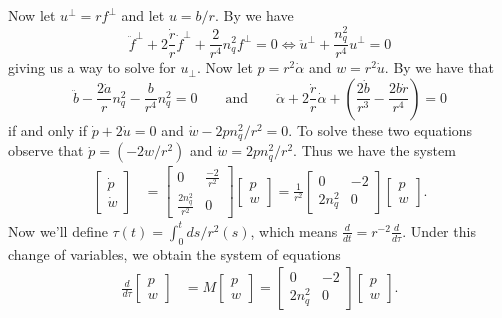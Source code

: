 \documentclass[11pt]{article}
\begin{document}
Now let $u^\perp = rf^\perp$ and let $u = b/r$. By  we have 
\begin{equation*} 
    \ddot f^{\perp} +  2\frac{\dot r}{r}\dot f^{\perp} +\frac{2}{r^4}n_q^2f^{\perp} = 0 \iff \ddot u^{\perp} + \frac{n_q^2}{r^4}u^\perp = 0
\end{equation*}
giving us a way to solve for $u_\perp$. Now let $p = r^2\dot \alpha$ and $w = r^2\dot u$. By  we have that
\begin{equation*} 
    \ddot b - \frac{2\dot a}{r}n_q^2 - \frac{b}{r^4} n_q^2 = 0 \qquad \text{and} \qquad \ddot \alpha +  2\frac{\dot r}{r}\dot \alpha + \left(\frac{2\dot b}{r^3} - \frac{ 2b\dot r}{r^4}\right) = 0
\end{equation*}
if and only if $\dot p + 2\dot u = 0$ and $\dot w - 2pn_q^2/r^2 = 0$.
To solve these two equations observe that $\dot p = (-2w/r^2)$ and $\dot w = 2pn_q^2/r^2$. Thus we have the system
\begin{align*}
    \begin{bmatrix}
        \dot p \\ \dot w
    \end{bmatrix} &=  
    \begin{bmatrix}
        0 & \frac{-2}{r^2} \\
        \frac{2n_q^2}{r^2} & 0 
    \end{bmatrix}
    \begin{bmatrix}
        p \\
        w
    \end{bmatrix} 
    = \frac{1}{r^2}
    \begin{bmatrix}
        0 & -2  \\
        2n_q^2 & 0 
    \end{bmatrix}
    \begin{bmatrix}
        p \\
        w
    \end{bmatrix}.
\end{align*}
Now we'll define $\tau(t) = \int_0^tds/r^2(s)$, which means $\frac{d}{dt} = r^{-2}\frac{d}{d\tau}$. Under this change of variables, we obtain the system of equations
\begin{align*}
    \frac{d}{d\tau}
    \begin{bmatrix}
        p \\ w
    \end{bmatrix} 
    &= M\begin{bmatrix}
        p \\
        w
    \end{bmatrix} =  \begin{bmatrix}
        0 & -2  \\
        2n_q^2 & 0 
    \end{bmatrix}
    \begin{bmatrix}
        p \\
        w
    \end{bmatrix}.
\end{align*}
\end{document}
